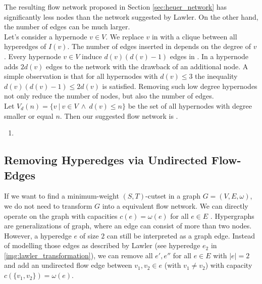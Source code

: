 The resulting flow network  proposed in Section \ref{sec:heuer_network} has significantly
less nodes than the network  suggested by Lawler. On the other hand, the number of
edges can be much larger. \\
Let's consider a hypernode $v \in V$. We replace $v$ in  with a clique between all
hyperedges of $I(v)$. The number of edges inserted in  depends on the degree of
$v$. Every hypernode $v \in V$ induce $d(v)(d(v) - 1)$ edges in . In  a hypernode adds $2d(v)$ edges to the network with the drawback
of an additional node. A simple observation is that for all hypernodes with $d(v) \le 3$ the inequality
$d(v)(d(v) - 1) \le 2d(v)$ is satisfied. Removing such low degree hypernodes not only reduce
the number of nodes, but also the number of edges. \\
Let $V_{d}(n) = \{v\ |\ v \in V\ \land\ d(v) \le n\}$ be the set of all hypernodes
with degree smaller or equal $n$. Then our suggested flow network is .

\begin{enumerate}
\item {}
\end{enumerate}

\subsection{Removing Hyperedges via Undirected Flow-Edges}
\label{sec:edge_size_network}

If we want to find a minimum-weight $(S,T)$-cutset in a graph $G = (V,E,\omega)$, we do not need to transform
$G$ into a equivalent flow network. We can directly operate on the graph with capacities
$c(e) = \omega(e)$ for all $e \in E$ \cite{ford1956maximal}. Hypergraphs are generalizations of graph, where
an edge can consist of more than two nodes. However, a hyperedge $e$ of size $2$ can still be 
interpreted as a graph edge. Instead of modelling those edges as described by Lawler \cite{lawler1973}
(see hyperedge $e_2$ in \autoref{img:lawler_transformation}), we can remove all $e',e''$ for all $e \in E$
with $|e| = 2$ and add an undirected flow edge between $v_1,v_2 \in e$ (with $v_1 \neq v_2$) with
capacity $c(\{v_1,v_2\}) = \omega(e)$.

